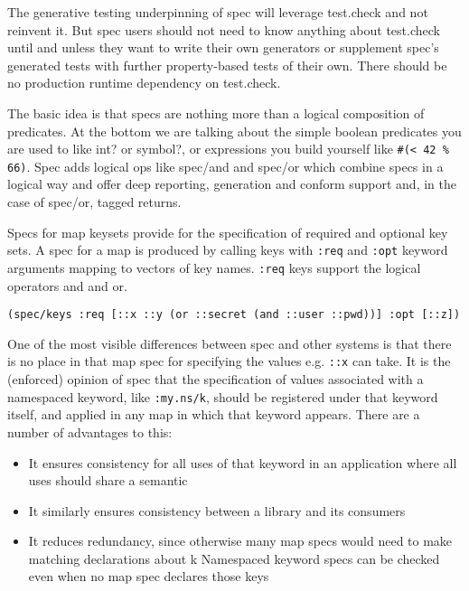 The generative testing underpinning of spec will leverage test.check and not
reinvent it. But spec users should not need to know anything about test.check
until and unless they want to write their own generators or supplement spec's
generated tests with further property-based tests of their own. There should be
no production runtime dependency on test.check.

The basic idea is that specs are nothing more than a logical composition of
predicates. At the bottom we are talking about the simple boolean predicates you
are used to like int? or symbol?, or expressions you build yourself like \texttt{\#(<
42 \% 66)}. Spec adds logical ops like spec/and and spec/or which combine specs
in a logical way and offer deep reporting, generation and conform support and,
in the case of spec/or, tagged returns.

Specs for map keysets provide for the specification of required and optional key
sets. A spec for a map is produced by calling keys with \texttt{:req} and
\texttt{:opt} keyword arguments mapping to vectors of key names. \texttt{:req}
keys support the logical operators and and or.

\begin{verbatim}
(spec/keys :req [::x ::y (or ::secret (and ::user ::pwd))] :opt [::z])
\end{verbatim}

One of the most visible differences between spec and other systems is that there
is no place in that map spec for specifying the values e.g. \texttt{::x} can
take. It is the (enforced) opinion of spec that the specification of values
associated with a namespaced keyword, like \texttt{:my.ns/k}, should be
registered under that keyword itself, and applied in any map in which that
keyword appears. There are a number of advantages to this:

\begin{itemize}
\item It ensures consistency for all uses of that keyword in an application where all
  uses should share a semantic

\item It similarly ensures consistency between a library
  and its consumers

\item It reduces redundancy, since otherwise many map specs would need to make
  matching declarations about k Namespaced keyword specs can be checked even
  when no map spec declares those keys

\end{itemize}

